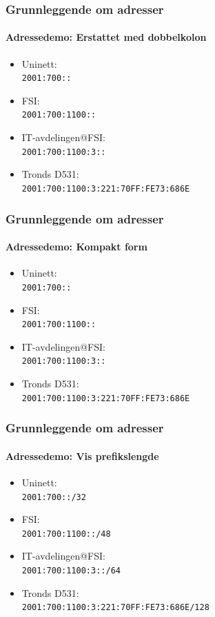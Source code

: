\begin{frame}%
  \frametitle{Grunnleggende om adresser}
  \framesubtitle{Adressedemo: Erstattet med dobbelkolon}
  \begin{itemize}%
  \item Uninett:\\\texttt{2001:700\alert{::}\phantom{/32}}
  \item FSI:\\\texttt{2001:700:1100\alert{::}\phantom{/48}}
  \item IT-avdelingen@FSI:\\\texttt{2001:700:1100:3\alert{::}\phantom{/64}}
  \item Tronds D531:\\\texttt{2001:700:1100:3:221:70FF:FE73:686E\phantom{/128}}
  \end{itemize}
\end{frame}

\begin{frame}%
  \frametitle{Grunnleggende om adresser}
  \framesubtitle{Adressedemo: Kompakt form}
  \begin{itemize}%
  \item Uninett:\\\texttt{2001:700::\phantom{/32}}
  \item FSI:\\\texttt{2001:700:1100::\phantom{/48}}
  \item IT-avdelingen@FSI:\\\texttt{2001:700:1100:3::\phantom{/64}}
  \item Tronds D531:\\\texttt{2001:700:1100:3:221:70FF:FE73:686E\phantom{/128}}
  \end{itemize}
\end{frame}

\begin{frame}%
  \frametitle{Grunnleggende om adresser}
  \framesubtitle{Adressedemo: Vis prefikslengde}
  \begin{itemize}%
  \item Uninett:\\\texttt{2001:700::\alert{/32}}
  \item FSI:\\\texttt{2001:700:1100::\alert{/48}}
  \item IT-avdelingen@FSI:\\\texttt{2001:700:1100:3::\alert{/64}}
  \item Tronds D531:\\\texttt{2001:700:1100:3:221:70FF:FE73:686E\alert{/128}}
  \end{itemize}
\end{frame}

